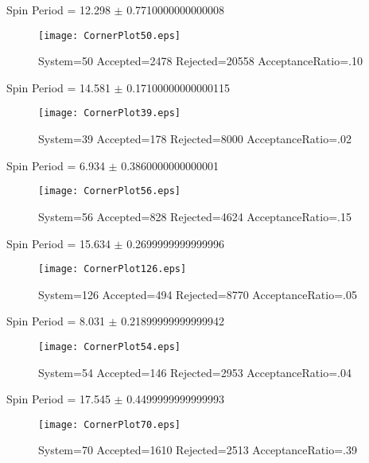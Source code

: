\documentclass[10pt]{article}
\begin{document}
\newpage
\begin{center}
        Spin Period = 12.298 $\pm$ 0.7710000000000008
        \end{center}
\begin{figure}[h] 
        \texttt{[image: CornerPlot50.eps]}
        \caption{System=50 Accepted=2478 Rejected=20558 AcceptanceRatio=.10}
        \label{S50}
        \centering
        \end{figure}
\newpage
\begin{center}
        Spin Period = 14.581 $\pm$ 0.17100000000000115
        \end{center}
\begin{figure}[h] 
        \texttt{[image: CornerPlot39.eps]}
        \caption{System=39 Accepted=178 Rejected=8000 AcceptanceRatio=.02}
        \label{S39}
        \centering
        \end{figure}
\newpage
\begin{center}
        Spin Period = 6.934 $\pm$ 0.3860000000000001
        \end{center}
\begin{figure}[h] 
        \texttt{[image: CornerPlot56.eps]}
        \caption{System=56 Accepted=828 Rejected=4624 AcceptanceRatio=.15}
        \label{S56}
        \centering
        \end{figure}
\newpage
\begin{center}
        Spin Period = 15.634 $\pm$ 0.2699999999999996
        \end{center}
\begin{figure}[h] 
        \texttt{[image: CornerPlot126.eps]}
        \caption{System=126 Accepted=494 Rejected=8770 AcceptanceRatio=.05}
        \label{S126}
        \centering
        \end{figure}
\newpage
\begin{center}
        Spin Period = 8.031 $\pm$ 0.21899999999999942
        \end{center}
\begin{figure}[h] 
        \texttt{[image: CornerPlot54.eps]}
        \caption{System=54 Accepted=146 Rejected=2953 AcceptanceRatio=.04}
        \label{S54}
        \centering
        \end{figure}
\newpage
\begin{center}
        Spin Period = 17.545 $\pm$ 0.4499999999999993
        \end{center}
\begin{figure}[h] 
        \texttt{[image: CornerPlot70.eps]}
        \caption{System=70 Accepted=1610 Rejected=2513 AcceptanceRatio=.39}
        \label{S70}
        \centering
        \end{figure}
\end{document}
